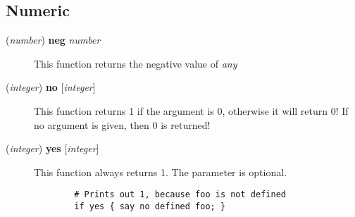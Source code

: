 \subsection*{Numeric\label{Numeric}}
\begin{description}

\item[{(\textit{number}) \textbf{neg} \textit{number}}] \mbox{}

This function returns the negative value of \textit{any}


\item[{(\textit{integer}) \textbf{no} [\textit{integer}]}] \mbox{}

This function returns 1 if the argument is 0, otherwise it will return 0! If no
argument is given, then 0 is returned!


\item[{(\textit{integer}) \textbf{yes} [\textit{integer}]}] \mbox{}

This function always returns 1. The parameter is optional.

\begin{verbatim}
        # Prints out 1, because foo is not defined
        if yes { say no defined foo; }
\end{verbatim}
\end{description}
